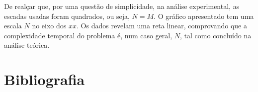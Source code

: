 \documentclass[12pt,a4paper]{article}
\begin{document}
  De realçar que, por uma questão de simplicidade, na análise experimental, as escadas usadas foram quadrados, ou seja, $N = M$.
  O gráfico apresentado tem uma escala $N$ no eixo dos $xx$.
  Os dados revelam uma reta linear, comprovando que a complexidade temporal do problema é, num caso geral, $N$, tal como concluído na análise teórica.

  \section{Bibliografia}

  \printbibliography
\end{document}
